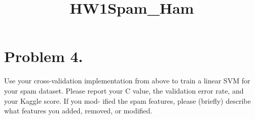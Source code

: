 \documentclass{article}
\title{HW1Spam\_Ham}
\begin{document}
    
    
    \maketitle
    
    

    
    \section{\textbf{Problem 4.}}\label{problem-4.}

    Use your cross-validation implementation from above to train a linear
SVM for your spam dataset. Please report your C value, the validation
error rate, and your Kaggle score. If you mod- ified the spam features,
please (briefly) describe what features you added, removed, or modified.
\end{document}
